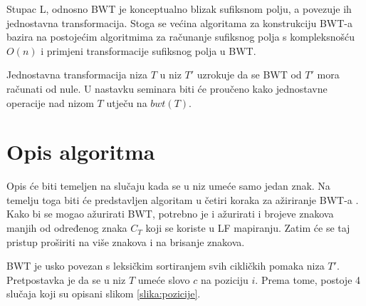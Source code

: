 \documentclass{ferseminar}
\begin{document}
Stupac L, odnosno BWT je konceptualno blizak sufiksnom polju, a povezuje ih jednostavna transformacija. Stoga se većina algoritama za konstrukciju BWT-a bazira na postojećim algoritmima za računanje sufiksnog polja s kompleksnošću $O(n)$ i primjeni transformacije sufiksnog polja u BWT.

Jednostavna transformacija niza $T$ u niz $T'$ uzrokuje da se BWT od $T'$ mora računati od nule. U nastavku seminara biti će proučeno kako jednostavne operacije nad nizom $T$ utječu na $bwt(T)$. 

\section{Opis algoritma}
Opis će biti temeljen na slučaju kada se u niz umeće samo jedan znak. Na temelju toga biti će predstavljen algoritam u četiri koraka za ažiriranje BWT-a \cite{salson}. Kako bi se mogao ažurirati BWT, potrebno je i ažurirati i brojeve znakova manjih od određenog znaka $C_T$ koji se koriste u LF mapiranju. Zatim će se taj pristup proširiti na više znakova i na brisanje znakova.

BWT je usko povezan s leksičkim sortiranjem svih cikličkih pomaka niza $T'$. Pretpostavka je da se u niz $T$ umeće slovo $c$ na poziciju $i$. Prema tome, postoje 4 slučaja koji su opisani slikom \ref{slika:pozicije}. 
\end{document}
